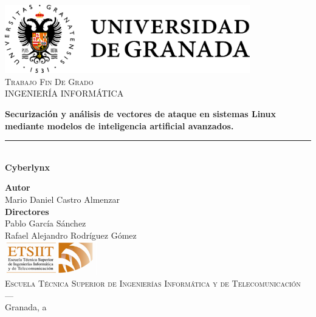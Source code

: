 \begin{titlepage}
 
 
\newlength{\centeroffset}
\setlength{\centeroffset}{-0.5\oddsidemargin}
\addtolength{\centeroffset}{0.5\evensidemargin}
\thispagestyle{empty}

\noindent\hspace*{\centeroffset}\begin{minipage}{\textwidth}

\centering
\includegraphics[width=0.8\textwidth]{imagenes/ugr.png}\\[1.4cm]

\textsc{ \Large Trabajo Fin De Grado\\[0.2cm]}
\textsc{ INGENIERÍA INFORMÁTICA}\\[1cm]


\vspace{3mm}

{\Large\bfseries Securización y análisis de vectores de ataque en sistemas Linux mediante modelos de inteligencia artificial avanzados.}

\vspace{1mm}
\noindent\rule[-1ex]{\textwidth}{1.5pt}\\[3.5ex]

{\Huge \bfseries Cyberlynx}

\end{minipage}

\vspace{2.5cm}
\noindent\hspace*{\centeroffset}\begin{minipage}{\textwidth}
\centering

\textbf{Autor}\\ {Mario Daniel Castro Almenzar}\\[2.5ex]
\textbf{Directores}\\
{Pablo García Sánchez\\
Rafael Alejandro Rodríguez Gómez}\\[2cm]
\includegraphics[width=0.3\textwidth]{imagenes/etsiit_logo.png}\\[0.1cm]
\textsc{Escuela Técnica Superior de Ingenierías Informática y de Telecomunicación}\\
\textsc{---}\\
Granada, a \DTMtoday
\end{minipage}

\end{titlepage}


